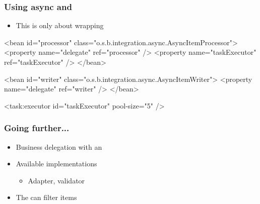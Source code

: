 \begin{frame}[fragile]
\frametitle{Using async  and }
\begin{itemize}
  \item This is only about wrapping  
 \end{itemize}
\begin{xmlcode}
<bean id="processor"
      class="o.s.b.integration.async.AsyncItemProcessor">
  <property name="delegate" ref="processor" />
  <property name="taskExecutor" ref="taskExecutor" />
</bean>

<bean id="writer"
      class="o.s.b.integration.async.AsyncItemWriter">
  <property name="delegate" ref="writer" />							
</bean>

<task:executor id="taskExecutor" pool-size="5" />
\end{xmlcode}
\end{frame}

\begin{frame}
 \frametitle{Going further...}
 \begin{itemize}
  \item Business delegation with an 
  \item Available  implementations
  \begin{itemize}
    \item Adapter, validator
  \end{itemize}
  \item The  can filter items
 \end{itemize}
\end{frame}

